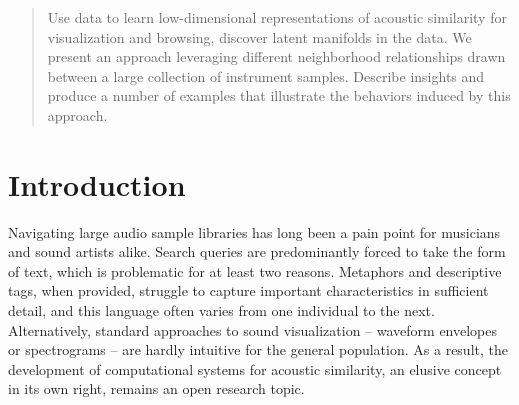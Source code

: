 \documentclass{article}
\begin{document}

\begin{abstract}

Use data to learn low-dimensional representations of acoustic similarity for visualization and browsing, discover latent manifolds in the data.
We present an approach leveraging different neighborhood relationships drawn between a large collection of instrument samples.
Describe insights and produce a number of examples that illustrate the behaviors induced by this approach.


\end{abstract}

\section{Introduction}
\label{submission}


Navigating large audio sample libraries has long been a pain point for musicians and sound artists alike.
Search queries are predominantly forced to take the form of text, which is problematic for at least two reasons.
Metaphors and descriptive tags, when provided, struggle to capture important characteristics in sufficient detail, and this language often varies from one individual to the next.
Alternatively, standard approaches to sound visualization -- waveform envelopes or spectrograms -- are hardly intuitive for the general population.
As a result, the development of computational systems for acoustic similarity, an elusive concept in its own right, remains an open research topic.
\end{document}
